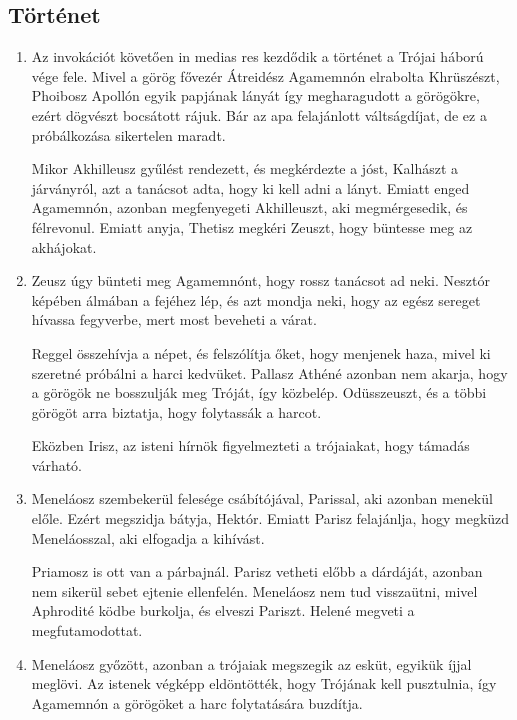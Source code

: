 \documentclass[]{article}
\begin{document}
		\subsection{Történet}
			\begin{enumerate}
				\item Az invokációt követően in medias res kezdődik a történet a Trójai háború vége fele. Mivel a görög fővezér Átreidész Agamemnón elrabolta Khrüszészt, Phoibosz Apollón egyik papjának lányát így megharagudott a görögökre, ezért dögvészt bocsátott rájuk. Bár az apa felajánlott váltságdíjat, de ez a próbálkozása sikertelen maradt.
				
				Mikor Akhilleusz gyűlést rendezett, és megkérdezte a jóst, Kalhászt a járványról, azt a tanácsot adta, hogy ki kell adni a lányt. Emiatt enged Agamemnón, azonban megfenyegeti Akhilleuszt, aki megmérgesedik, és félrevonul. Emiatt anyja, Thetisz megkéri Zeuszt, hogy büntesse meg az akhájokat.
				
				\item Zeusz úgy bünteti meg Agamemnónt, hogy rossz tanácsot ad neki. Nesztór képében álmában a fejéhez lép, és azt mondja neki, hogy az egész sereget hívassa fegyverbe, mert most beveheti a várat. 
				
				Reggel összehívja a népet, és felszólítja őket, hogy menjenek haza, mivel ki szeretné próbálni a harci kedvüket. Pallasz Athéné azonban nem akarja, hogy a görögök ne bosszulják meg Tróját, így közbelép. Odüsszeuszt, és a többi görögöt arra biztatja, hogy folytassák a harcot.
				
				Eközben Irisz, az isteni hírnök figyelmezteti a trójaiakat, hogy támadás várható.
				
				\item Meneláosz szembekerül felesége csábítójával, Parissal, aki azonban menekül előle. Ezért megszidja bátyja, Hektór. Emiatt Parisz felajánlja, hogy megküzd Meneláosszal, aki elfogadja a kihívást.
				
				Priamosz is ott van a párbajnál. Parisz vetheti előbb a dárdáját, azonban nem sikerül sebet ejtenie ellenfelén. Meneláosz nem tud visszaütni, mivel Aphrodité ködbe burkolja, és elveszi Pariszt. Helené megveti a megfutamodottat.
				
				\item Meneláosz győzött, azonban a trójaiak megszegik az esküt, egyikük íjjal meglövi. Az istenek végképp eldöntötték, hogy Trójának kell pusztulnia, így Agamemnón a görögöket a harc folytatására buzdítja.
				

\end{enumerate}
\end{document}
